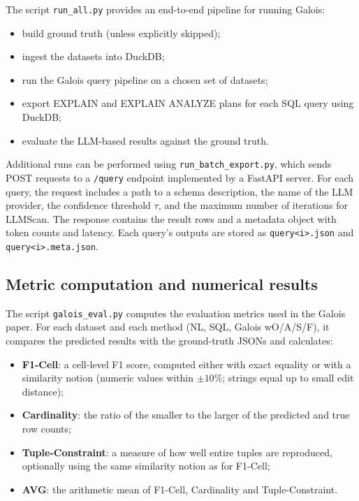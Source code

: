 \documentclass[11pt]{article}
\begin{document}
The script \texttt{run\_all.py} provides an end-to-end pipeline for running Galois:

\begin{itemize}
  \item build ground truth (unless explicitly skipped);
  \item ingest the datasets into DuckDB;
  \item run the Galois query pipeline on a chosen set of datasets;
  \item export EXPLAIN and EXPLAIN ANALYZE plans for each SQL query using DuckDB;
  \item evaluate the LLM-based results against the ground truth.
\end{itemize}

Additional runs can be performed using \texttt{run\_batch\_export.py}, which sends POST requests to a \texttt{/query} endpoint implemented by a FastAPI server. For each query, the request includes a path to a schema description, the name of the LLM provider, the confidence threshold $\tau$, and the maximum number of iterations for LLMScan. The response contains the result rows and a metadata object with token counts and latency. Each query's outputs are stored as \texttt{query<i>.json} and \texttt{query<i>.meta.json}.

\subsection{Metric computation and numerical results}

The script \texttt{galois\_eval.py} computes the evaluation metrics used in the Galois paper. For each dataset and each method (NL, SQL, Galois wO/A/S/F), it compares the predicted results with the ground-truth JSONs and calculates:

\begin{itemize}
  \item \textbf{F1-Cell}: a cell-level F1 score, computed either with exact equality or with a similarity notion (numeric values within $\pm 10\%$; strings equal up to small edit distance);
  \item \textbf{Cardinality}: the ratio of the smaller to the larger of the predicted and true row counts;
  \item \textbf{Tuple-Constraint}: a measure of how well entire tuples are reproduced, optionally using the same similarity notion as for F1-Cell;
  \item \textbf{AVG}: the arithmetic mean of F1-Cell, Cardinality and Tuple-Constraint.
\end{itemize}
\end{document}
